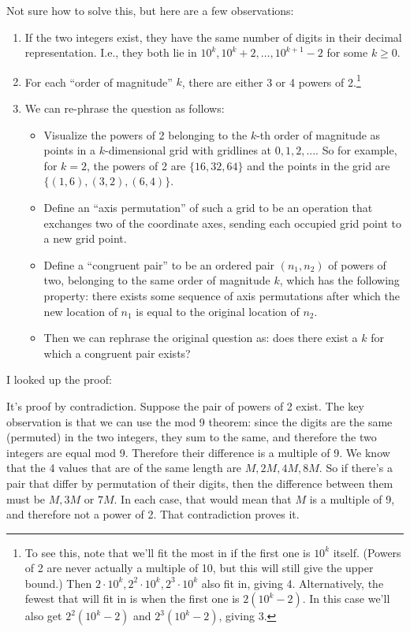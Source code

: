 \documentclass[12pt]{article}
\begin{document}
\begin{mdframed}
  Not sure how to solve this, but here are a few observations:
  \begin{enumerate}
  \item If the two integers exist, they have the same number of digits in their
    decimal representation. I.e., they both lie in
    ${10^k,10^k + 2, \ldots, 10^{k+1} - 2}$ for some $k \geq 0$.
  \item For each ``order of magnitude'' $k$, there are either 3 or 4 powers of
    2.\footnote{To see this, note that we'll fit the most in if the first one
      is $10^k$ itself. (Powers of 2 are never actually a multiple of 10, but
      this will still give the upper bound.) Then
      $2\cdot 10^k, 2^2\cdot 10^k,2^3\cdot 10^k$ also fit in, giving
      4. Alternatively, the fewest that will fit in is when the first one is
      $2(10^k - 2)$. In this case we'll also get $2^2(10^k - 2)$ and
      $2^3(10^k - 2)$, giving 3.}
  \item We can re-phrase the question as follows:
    \begin{itemize}
    \item Visualize the powers of 2 belonging to the $k$-th order
      of magnitude as points in a $k$-dimensional grid with gridlines at
      $0, 1, 2, ...$. So for example, for $k=2$, the powers of 2 are
      $\{16, 32, 64\}$ and the points in the grid are
      $\{(1,6), (3,2), (6,4)\}$.
    \item Define an ``axis permutation'' of such a grid to be an operation that
      exchanges two of the coordinate axes, sending each occupied grid point to a
      new grid point.
    \item Define a ``congruent pair'' to be an ordered pair $(n_1, n_2)$ of
      powers of two, belonging to the same order of magnitude $k$, which has
      the following property: there exists some sequence of axis permutations
      after which the new location of $n_1$ is equal to the original location
      of $n_2$.
    \item Then we can rephrase the original question as: does there exist a $k$
      for which a congruent pair exists?
    \end{itemize}
  \end{enumerate}

  I looked up the proof:

  It's proof by contradiction. Suppose the pair of powers of 2 exist. The key
  observation is that we can use the mod 9 theorem: since the digits are the
  same (permuted) in the two integers, they sum to the same, and therefore the
  two integers are equal mod 9. Therefore their difference is a multiple of
  9. We know that the 4 values that are of the same length are $M, 2M, 4M,
  8M$. So if there's a pair that differ by permutation of their digits, then
  the difference between them must be $M, 3M$ or $7M$. In each case, that would
  mean that $M$ is a multiple of 9, and therefore not a power of 2. That
  contradiction proves it.

\end{mdframed}
\end{document}
